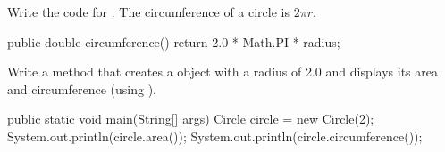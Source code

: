 \Q Write the code for .
The circumference of a circle is $2 \pi r$.

\begin{answer}[5em]
\begin{javaans}
public double circumference() {
    return 2.0 * Math.PI * radius;
}
\end{javaans}
\end{answer}


\Q \label{circmain}
Write a  method that creates a  object with a radius of 2.0 and displays its area and circumference (using ).

\begin{answer}[8em]
\begin{javaans}
public static void main(String[] args) {
    Circle circle = new Circle(2);
    System.out.println(circle.area());
    System.out.println(circle.circumference());
}
\end{javaans}
\end{answer}

